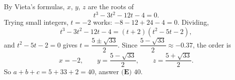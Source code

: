 By Vieta's formulas, $x$, $y$, $z$ are the roots of
\[t^3-3t^2-12t-4=0 .\]
Trying small integers, $t=-2$ works: $-8-12+24-4=0$. Dividing,
\[t^3-3t^2-12t-4=(t+2)(t^2-5t-2),\]
and $t^2-5t-2=0$ gives $t=\dfrac{5\pm\sqrt{33}}{2}$. Since $\dfrac{5-\sqrt{33}}{2}\approx-0.37$, the order is
\[x=-2,\qquad y=\dfrac{5-\sqrt{33}}{2},\qquad z=\dfrac{5+\sqrt{33}}{2}.\]
So $a+b+c=5+33+2=40$, answer $\boxed{\textbf{(E) } 40}$.

